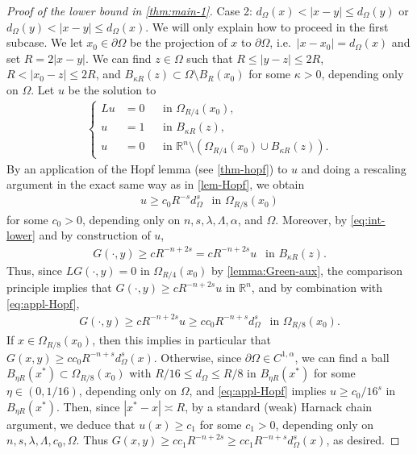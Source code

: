 \documentclass[11pt,reqno]{amsart}
\theoremstyle{plain}
\theoremstyle{definition}
\numberwithin{equation}{section}
\newcommand{\R}{\mathbb{R}}
\newcommand{\1}{\mathbbm{1}}
\begin{document}
\begin{proof}[Proof of the lower bound in \autoref{thm:main-1}]
Case 2: $d_{\Omega}(x) < |x-y| \le d_{\Omega}(y)$ or $d_{\Omega}(y) < |x-y| \le d_{\Omega}(x)$. We will only explain how to proceed in the first subcase. We let $x_0 \in \partial \Omega$ be the projection of $x$ to $\partial \Omega$, i.e.\ $|x - x_0| = d_{\Omega}(x)$ and set $R = 2|x-y|$. We can find $z \in \Omega$ such that $R \le |y-z| \le 2R$, $R < |x_0 - z| \le 2R$, and $B_{\kappa R}(z) \subset \Omega \setminus B_R(x_0)$ for some $\kappa >0$, depending only on $\Omega$. Let $u$ be the solution to
\begin{align*}
\left\{
\begin{aligned}
        L u &= 0 &&\text{in } \Omega_{R/4}(x_0),\\
        u &= 1 &&\text{in } B_{\kappa R}(z),\\
        u &= 0 &&\text{in } \R^n \setminus (\Omega_{R/4}(x_0) \cup B_{\kappa R}(z)).
\end{aligned}
\right.
\end{align*}
By an application of the Hopf lemma (see \autoref{thm-hopf}) to $u$ and doing a rescaling argument in the exact same way as in \autoref{lem-Hopf}, we obtain
\begin{align}
\label{eq:appl-Hopf}
    u \ge c_0 R^{-s} d_{\Omega}^s ~~ \text{ in } \Omega_{R/8}(x_0)
\end{align}
for some $c_0 > 0$, depending only on $n,s,\lambda,\Lambda,\alpha$, and $\Omega$. Moreover, by \eqref{eq:int-lower} and by construction of $u$,
\begin{align*}
    G(\cdot,y) \ge c R^{-n+2s} = c R^{-n+2s} u ~~ \text{ in } B_{\kappa R}(z).
\end{align*}
Thus, since $L G(\cdot,y) = 0$ in $\Omega_{R/4}(x_0)$ by \autoref{lemma:Green-aux}, the comparison principle implies that $G(\cdot,y) \ge c R^{-n+2s} u$ in $\R^n$, and by combination with \eqref{eq:appl-Hopf},
\begin{align*}
    G(\cdot,y) \ge c R^{-n+2s} u \ge cc_0 R^{-n+s} d^s_{\Omega} ~~ \text{ in } \Omega_{R/8}(x_0).
\end{align*}
If $x \in \Omega_{R/8}(x_0)$, then this implies in particular that $G(x, y) \geq cc_0 R^{-n+s}d_\Omega^s(x)$. Otherwise, since $\partial \Omega \in C^{1,\alpha}$, we can find a ball $B_{\eta R}(x^{\ast}) \subset \Omega_{R/8}(x_0)$ with $R/16 \le d_{\Omega} \le R/8$ in $B_{\eta R}(x^{\ast})$ for some $\eta \in (0,1/16)$, depending only on $\Omega$, and \eqref{eq:appl-Hopf} implies $u \ge c_0/16^s$ in $B_{\eta R}(x^{\ast})$. Then, since $|x^{\ast} - x| \asymp R$, by a standard (weak) Harnack chain argument, we deduce that $u(x) \ge c_1$ for some $c_1 > 0$, depending only on $n,s,\lambda,\Lambda,c_0,\Omega$. Thus $G(x,y) \ge c c_1 R^{-n+2s} \ge c c_1 R^{-n+s} d_{\Omega}^s(x)$, as desired.


\end{proof}
\end{document}
